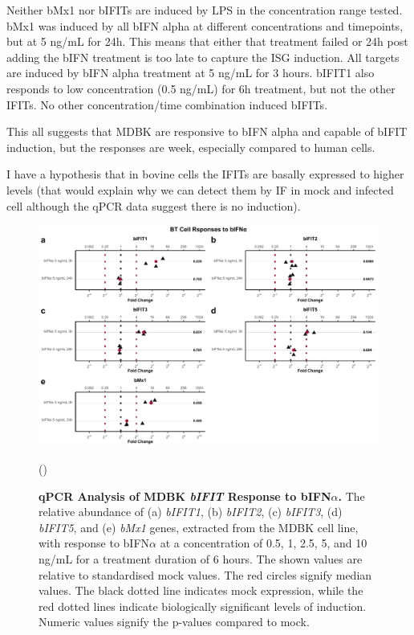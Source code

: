 Neither bMx1 nor bIFITs are induced by LPS in the concentration range tested. bMx1 was induced by all bIFN alpha at different concentrations and timepoints, but at 5 ng/mL for 24h. This means that either that treatment failed or 24h post adding the bIFN treatment is too late to capture the ISG induction. All targets are induced by bIFN alpha treatment at 5 ng/mL for 3 hours. bIFIT1 also responds to low concentration (0.5 ng/mL) for 6h treatment, but not the other IFITs. No other concentration/time combination induced bIFITs. 

This all suggests that MDBK are responsive to bIFN alpha and capable of bIFIT induction, but the responses are week, especially compared to human cells.

I have a hypothesis that in bovine cells the IFITs are basally expressed to higher levels  (that would explain why we can detect them by IF in mock and infected cell although the qPCR data suggest there is no induction).


\begin{figure}
    \centering
    \includegraphics[width=1\linewidth]{07. Chapter 2/Figs/02. Induction/08. bt_bifna.pdf}
    \caption[qPCR Analysis of BT \textit{bIFIT} Response to bIFN\(\alpha\).]{\textbf{qPCR Analysis of MDBK \textit{bIFIT} Response to bIFN\(\alpha\).} The relative abundance of (a) \textit{bIFIT1}, (b) \textit{bIFIT2}, (c) \textit{bIFIT3}, (d) \textit{bIFIT5}, and (e) \textit{bMx1} genes, extracted from the MDBK cell line, with response to bIFN\(\alpha\) at a concentration of 0.5, 1, 2.5, 5, and 10 ng/mL for a treatment duration of 6 hours. The shown values are relative to standardised mock values. The red circles signify median values. The black dotted line indicates mock expression, while the red dotted lines indicate biologically significant levels of induction. Numeric values signify the p-values compared to mock.}
    \label{BT responses to bifna}

(\cite{McClurkin1974ComparisonVirus})

    
\end{figure}
